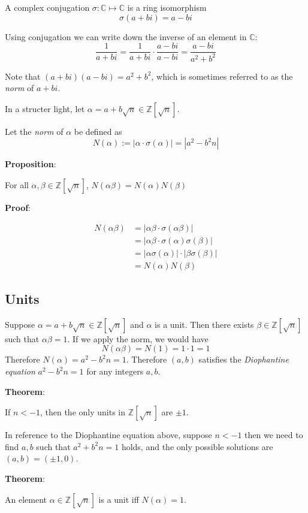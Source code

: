 \documentclass{article}
\begin{document}
\begin{multicols*}{2}
A complex  conjugation $\sigma : \mathbb{C} \mapsto \mathbb{C}$ is a ring isomorphism \[\sigma(a+bi) = a-bi\]

Using conjugation we can write down the inverse of an element in $\mathbb{C}$:\[\frac{1}{a+bi} = \frac{1}{a+bi} \cdot \frac{a-bi}{a-bi} = \frac{a-bi}{a^2 + b^2}\]

Note that $(a+bi)(a-bi) = a^2 + b^2$, which is sometimes referred to as the \textit{norm} of $a+bi$. 

In a structer light, let $\alpha = a + b\sqrt{n} \in \mathbb{Z}[\sqrt{n}]$. 

Let the \textit{norm} of $\alpha$ be defined as \[N(\alpha) := |\alpha \cdot \sigma(\alpha)| = |a^2 - b^2n|\]

\textbf{Proposition}:

For all $\alpha, \beta \in \mathbb{Z}[\sqrt{n}]$, $N(\alpha\beta) = N(\alpha)N(\beta)$

\textbf{Proof}:

\[\begin{aligned}
    N(\alpha\beta) &= |\alpha\beta \cdot \sigma(\alpha\beta)|\\
    &= |\alpha\beta \cdot \sigma(\alpha)\sigma(\beta)|\\
    &= |\alpha\sigma(\alpha)|\cdot |\beta\sigma(\beta)|\\
    &= N(\alpha)N(\beta)
\end{aligned}\]

\subsection{Units}

Suppose $\alpha = a + b\sqrt{n} \in \mathbb{Z}[\sqrt{n}]$ and $\alpha$ is a unit. Then there exists $\beta \in \mathbb{Z}[\sqrt{n}]$ such that $\alpha\beta = 1$. If we apply the norm, we would have \[N(\alpha\beta) = N(1) = 1 \cdot 1 = 1\] Therefore $N(\alpha) = a^2 - b^2n = 1$. Therefore $(a, b)$ satisfies the \textit{Diophantine equation} $a^2 - b^2n = 1$ for any integers $a, b$.

\textbf{Theorem}:

If $n < -1$, then the only units in $\mathbb{Z}[\sqrt{n}]$ are $\pm 1$.

In reference to the Diophantine equation above, suppose $n < -1$ then we need to find $a, b$ such that $a^2 + b^2n= 1$ holds, and the only possible solutions are $(a, b) = (\pm 1, 0)$.

\textbf{Theorem}:

An element $\alpha \in \mathbb{Z}[\sqrt{n}]$ is a unit iff $N(\alpha) = 1$.


\end{multicols*}
\end{document}

